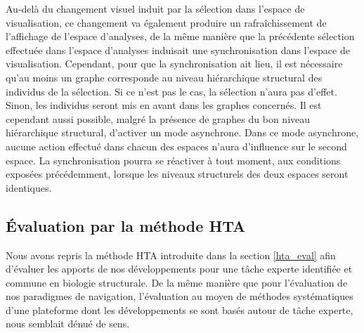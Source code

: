 Au-delà du changement visuel induit par la sélection dans l'espace de visualisation, ce changement va également produire un rafraîchissement de l'affichage de l'espace d'analyses, de la même manière que la précédente sélection effectuée dans l'espace d'analyses induisait une synchronisation dans l'espace de visualisation. Cependant, pour que la synchronisation ait lieu, il est nécessaire qu'au moins un graphe corresponde au niveau hiérarchique structural des individus de la sélection. Si ce n'est pas le cas, la sélection n'aura pas d'effet. Sinon, les individus seront mis en avant dans les graphes concernés. Il est cependant aussi possible, malgré la présence de graphes du bon niveau hiérarchique structural, d'activer un mode asynchrone. Dans ce mode asynchrone, aucune action effectué dans chacun des espaces n'aura d'influence sur le second espace. La synchronisation pourra se réactiver à tout moment, aux conditions exposées précédemment, lorsque les niveaux structurels des deux espaces seront identiques.


\subsection{Évaluation par la méthode HTA}

Nous avons repris la méthode HTA introduite dans la section \ref{hta_eval} afin d'évaluer les apports de nos développements pour une tâche experte identifiée et commune en biologie structurale. De la même manière que pour l'évaluation de nos paradigmes de navigation, l'évaluation au moyen de méthodes systématiques d'une plateforme dont les développements se sont basés autour de tâche experte, nous semblait dénué de sens.

